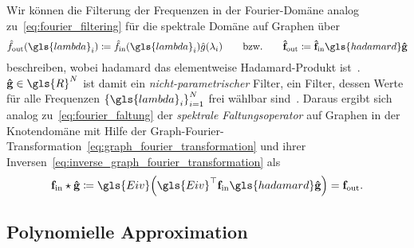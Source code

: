 Wir können die Filterung der Frequenzen in der Fourier-Domäne analog zu~\eqref{eq:fourier_filtering} für die spektrale Domäne auf Graphen über
\begin{equation*}
  \hat f_{\mathrm{out}}\left(\gls{lambda}_i\right) \coloneqq \hat f_{\mathrm{in}}\left(\gls{lambda}_i\right)\hat g\left(\lambda_i\right)
  \qquad
  \text{\bzw{}}
  \qquad
  \ve{\hat f}_{\mathrm{out}} \coloneqq \ve{\hat f}_{\mathrm{in}} \gls{hadamard} \ve{\hat g}
\end{equation*}
beschreiben, wobei \gls{hadamard} das elementweise Hadamard-Produkt ist~\cite{Shuman}.
$\ve{\hat g} \in \gls{R}^N$ ist damit ein \emph{nicht-parametrischer} Filter, \dhe{} ein Filter, dessen Werte für alle Frequenzen ${\left\{\gls{lambda}_i\right\}}_{i=1}^N$ frei wählbar sind~\cite{Defferrard}.
Daraus ergibt sich analog zu~\eqref{eq:fourier_faltung} der \emph{spektrale Faltungsoperator} auf Graphen in der Knotendomäne mit Hilfe der Graph-Fourier-Transformation~\eqref{eq:graph_fourier_transformation} und ihrer Inversen~\eqref{eq:inverse_graph_fourier_transformation} als~\cite{Shuman, Defferrard}
\begin{equation}
  \ve{f}_{\mathrm{in}} \star \ve{\hat g} \coloneqq \gls{Eiv}\left(\gls{Eiv}^{\top}\ve{f}_{\mathrm{in}} \gls{hadamard} \ve{\hat g}\right) = \ve{f}_{\mathrm{out}}.
  \label{eq:spektraler_faltungsoperator}
\end{equation}

\subsection{Polynomielle Approximation}
\label{polynomielle_approximation}

